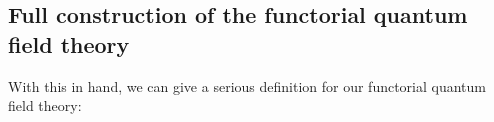\documentclass[11pt]{report}
\newtheorem{prop}[theorem]{Proposition}
\theoremstyle{definition}
\theoremstyle{remark}
\theoremstyle{remark}
\newcommand{\Hom}{\operatorname{Hom}}
\newcommand{\C}{\mathbb{C}}
\begin{document}


\subsection{Full construction of the functorial quantum field theory}

With this in hand, we can give a serious definition for our functorial quantum field theory:
\end{document}
